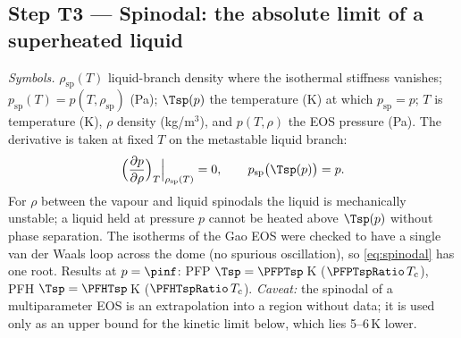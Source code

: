 \subsection{Step T3 --- Spinodal: the absolute limit of a superheated liquid}
\emph{Symbols.} $\rho_{\mathrm{sp}}(T)$ liquid-branch density where the isothermal stiffness vanishes;
$p_{\mathrm{sp}}(T)=p(T,\rho_{\mathrm{sp}})$ (Pa); $\Tsp(p)$ the temperature (K) at which
$p_{\mathrm{sp}}=p$; $T$ is temperature (K), $\rho$ density (kg/m$^3$), and $p(T,\rho)$ the EOS
pressure (Pa). The derivative is taken at fixed $T$ on the metastable liquid branch:
\begin{equation}
\Bigl(\frac{\partial p}{\partial\rho}\Bigr)_T\Big|_{\rho_{\mathrm{sp}}(T)}=0,\qquad
p_{\mathrm{sp}}\bigl(\Tsp(p)\bigr)=p .\label{eq:spinodal}
\end{equation}
For $\rho$ between the vapour and liquid spinodals the liquid is mechanically unstable; a liquid held at
pressure $p$ cannot be heated above $\Tsp(p)$ without phase separation. The isotherms of the Gao EOS were
checked to have a single van der Waals loop across the dome (no spurious oscillation), so
\eqref{eq:spinodal} has one root. Results at $p=\pinf$: PFP $\Tsp=\PFPTsp$\,K
($\PFPTspRatio\,T_{\mathrm c}$), PFH $\Tsp=\PFHTsp$\,K ($\PFHTspRatio\,T_{\mathrm c}$).
\emph{Caveat:} the spinodal of a multiparameter EOS is an extrapolation into a region without data; it
is used only as an upper bound for the kinetic limit below, which lies 5--6\,K lower.

